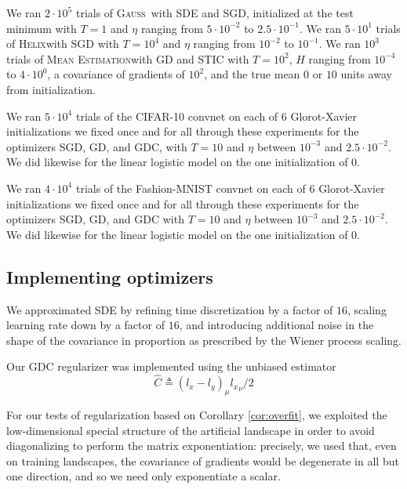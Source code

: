\documentclass[anon,12pt]{colt2021} %
\newcommand{\Gauss}{\textsc{Gauss}}
\newcommand{\Helix}{\textsc{Helix}}
\newcommand{\MeanEstimation}{\textsc{Mean Estimation}}
\begin{document}
{                We ran $2 \cdot 10^5$ trials of \Gauss\, with SDE and SGD,
                initialized at the test minimum with $T=1$ and $\eta$ ranging from
                $5\cdot 10^{-2}$ to $2.5\cdot 10^{-1}$.
                We ran $5 \cdot 10^1$ trials of \Helix with SGD with $T=10^4$
            and $\eta$ ranging from $10^{-2}$ to $10^{-1}$.
            We ran $10^3$ trials of \MeanEstimation with GD and STIC
            with $T=10^2$, $H$ ranging from $10^{-4}$ to $4 \cdot 10^0$,
            a covariance of gradients of $10^2$, and the true mean $0$ or
            $10$ units away from initialization.

            We ran $5 \cdot 10^4$ trials of the CIFAR-10 convnet on each of $6$
            Glorot-Xavier initializations we fixed once and for all through
            these experiments for the optimizers SGD, GD, and GDC, with $T=10$
            and $\eta$ between $10^{-3}$ and $2.5 \cdot 10^{-2}$.  We did
            likewise for the linear logistic model on the one initialization of
            $0$.

            We ran $4 \cdot 10^4$ trials of the Fashion-MNIST convnet on each
            of $6$ Glorot-Xavier initializations we fixed once and for all
            through these experiments for the optimizers SGD, GD, and GDC with
            $T=10$ and $\eta$ between $10^{-3}$ and $2.5 \cdot 10^{-2}$.  We
            did likewise for the linear logistic model on the one
            initialization of $0$. 

    \subsection{Implementing optimizers}                            \label{appendix:optimizers}

        We approximated SDE by refining time discretization by a factor of
        $16$, scaling learning rate down by a factor of $16$, and introducing
        additional noise in the shape of the covariance in proportion as
        prescribed by the Wiener process scaling.

        Our GDC regularizer was implemented using the unbiased estimator
        $$
            \hat{C} \triangleq (l_x - l_y)_\mu {l_x}_\nu / 2
        $$
        
        For our tests of regularization based on Corollary \ref{cor:overfit},
        we exploited the low-dimensional special structure of the artificial
        landscape in order to avoid diagonalizing to perform the matrix
        exponentiation: precisely, we used that, even on training landscapes,
        the covariance of gradients would be degenerate in all but one
        direction, and so we need only exponentiate a scalar.

}
\end{document}

